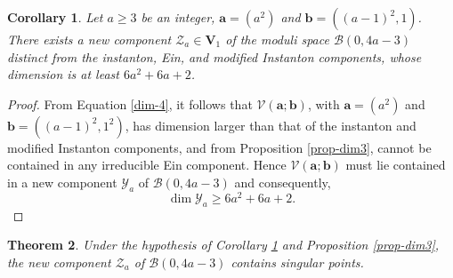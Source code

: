 \documentclass[twoside,reqno]{amsart}
\theoremstyle{plain}
\newtheorem{theorem}{Theorem}[section]
\newtheorem{corollary}[theorem]{Corollary}
\begin{document}
%
\begin{corollary}\label{family-2}
Let $a\geq3$ be an integer, $\boldsymbol{a}=(a^2)$ and 
$\boldsymbol{b}=({(a-1)}^2,1)$. There exists a new component $\mathcal{Z}_a\in\mathbf{V}_1$ of the moduli space 
$\mathcal{B}(0,4a-3)$ distinct 
from the instanton, Ein, and modified Instanton components, whose dimension is at least $6a^2+6a+2$.
\end{corollary}
\begin{proof}
From Equation \eqref{dim-4}, it follows that 
$\mathcal{V}(\boldsymbol{a};\boldsymbol{b})$, with $\boldsymbol{a}=(a^2)$ and $\boldsymbol{b}=({(a-1)}^2,1^2)$, has 
dimension larger than that of the instanton and modified Instanton components, and from Proposition \ref{prop-dim3}, cannot be contained in any irreducible Ein component. Hence 
$\mathcal{V}(\boldsymbol{a};\boldsymbol{b})$ must lie contained in a new component $\mathcal{Y}_a$ 
of $\mathcal{B}(0,4a-3)$ and consequently,
$$\dim \mathcal{Y}_a\geq 6a^2+6a+2.$$
\end{proof}
%
\begin{theorem}
Under the hypothesis of Corollary \ref{family-2} and Proposition \ref{prop-dim3}, the new component $\mathcal{Z}_a$ of 
$\mathcal{B}(0,4a-3)$ contains singular points.
\end{theorem}
\end{document}

